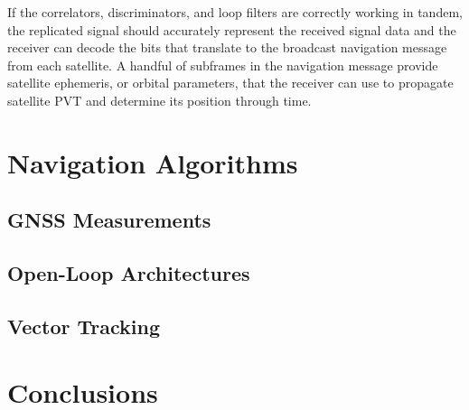 If the correlators, discriminators, and loop filters are correctly working in tandem, the replicated signal should accurately represent the received signal data and the receiver can decode the bits that translate to the broadcast navigation message from each satellite. A handful of subframes in the navigation message provide satellite ephemeris, or orbital parameters, that the receiver can use to propagate satellite PVT and determine its position through time. 

\section{Navigation Algorithms}

\subsection{GNSS Measurements}
\subsection{Open-Loop Architectures}
\subsection{Vector Tracking}

\section{Conclusions}